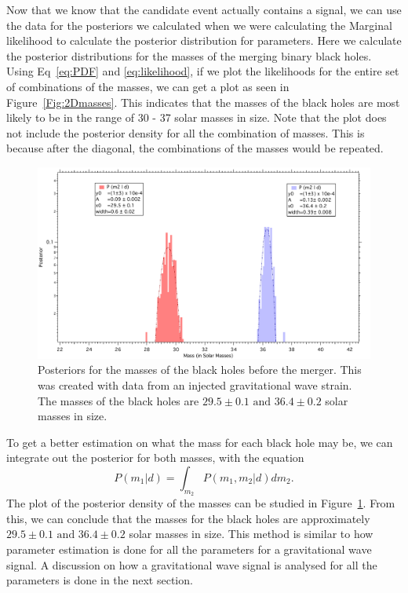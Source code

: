 \documentclass{article}
\begin{document}
 Now that we know that the candidate event actually contains a signal, we can use the data for the posteriors we calculated when we were calculating the Marginal likelihood to calculate the posterior distribution for parameters. Here we calculate the posterior distributions for the masses of the merging binary black holes. Using Eq~\ref{eq:PDF} and \ref{eq:likelihood}, if we plot the likelihoods for the entire set of combinations of the masses, we can get a plot as seen in Figure~\ref{Fig:2Dmasses}. This indicates that the masses of the black holes are most likely to be in the range of 30 - 37 solar masses in size. Note that the plot does not include the posterior density for all the combination of masses. This is because after the diagonal, the combinations of the masses would be repeated. \\
 
     \begin{figure}[h]
     	\centering
     	\includegraphics[width=1\textwidth]{Figures/MassPost.pdf} 
     	\caption{Posteriors for the masses of the black holes before the  merger. This was created with data from an injected gravitational wave strain. The masses  of the black holes are $29.5\pm0.1 \text{ and } 36.4\pm0.2$ solar masses in size.}
     	\label{Fig:1Dmasses}
     \end{figure}
 
 
 To get a better estimation on what the mass for each black hole may be, we can integrate out the posterior for both masses, with the equation $$P(m_1|d)= \int_{m_2} {P(m_1, m_2 | d) dm_2}.$$ The plot of the posterior density of the masses can be studied in Figure~\ref{Fig:1Dmasses}. From this, we can conclude that the masses for the black holes are approximately $29.5\pm0.1 \text{ and } 36.4\pm0.2$ solar masses in size. This method is similar to how parameter estimation is done for all the parameters for a gravitational wave signal. A discussion on how a gravitational wave signal is analysed for all the parameters is done in the next section.\\
 
\end{document}
